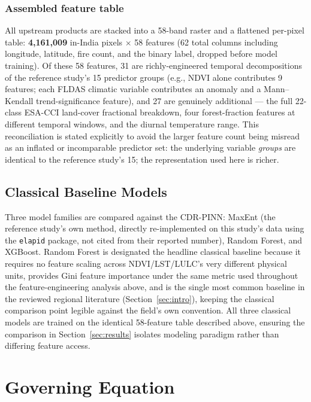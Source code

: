 \documentclass[journal]{IEEEtran}
\begin{document}
\subsubsection{Assembled feature table}
All upstream products are stacked into a 58-band raster and a flattened per-pixel table: \textbf{4,161,009} in-India pixels $\times$ 58 features (62 total columns including longitude, latitude, fire count, and the binary label, dropped before model training). Of these 58 features, 31 are richly-engineered temporal decompositions of the reference study's 15 predictor groups (e.g., NDVI alone contributes 9 features; each FLDAS climatic variable contributes an anomaly and a Mann--Kendall trend-significance feature), and 27 are genuinely additional --- the full 22-class ESA-CCI land-cover fractional breakdown, four forest-fraction features at different temporal windows, and the diurnal temperature range. This reconciliation is stated explicitly to avoid the larger feature count being misread as an inflated or incomparable predictor set: the underlying variable \emph{groups} are identical to the reference study's 15; the representation used here is richer.

\subsection{Classical Baseline Models}

Three model families are compared against the CDR-PINN: MaxEnt (the reference study's own method, directly re-implemented on this study's data using the \texttt{elapid} package, not cited from their reported number), Random Forest, and XGBoost. Random Forest is designated the headline classical baseline because it requires no feature scaling across NDVI/LST/LULC's very different physical units, provides Gini feature importance under the same metric used throughout the feature-engineering analysis above, and is the single most common baseline in the reviewed regional literature (Section~\ref{sec:intro}), keeping the classical comparison point legible against the field's own convention. All three classical models are trained on the identical 58-feature table described above, ensuring the comparison in Section~\ref{sec:results} isolates modeling paradigm rather than differing feature access.

\section{Governing Equation}
\label{sec:governing_eq}
\end{document}
